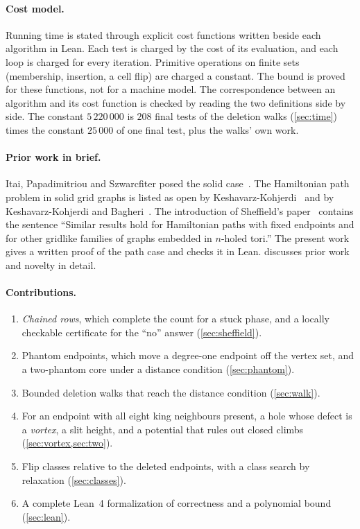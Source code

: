 \documentclass[11pt]{article}
\theoremstyle{plain}
\theoremstyle{definition}
\theoremstyle{remark}
\begin{document}
\paragraph{Cost model.}
Running time is stated through explicit cost functions written beside each algorithm in Lean.
Each test is charged by the cost of its evaluation, and each loop is charged for every iteration.
Primitive operations on finite sets (membership, insertion, a cell flip) are charged a constant.
The bound is proved for these functions, not for a machine model.
The correspondence between an algorithm and its cost function is checked by reading the two
definitions side by side.
The constant $5\,220\,000$ is $208$ final tests of the deletion walks (\cref{sec:time}) times the
constant $25\,000$ of one final test, plus the walks' own work.

\paragraph{Prior work in brief.}
Itai, Papadimitriou and Szwarcfiter posed the solid case~\cite{itai1982}.
The Hamiltonian path problem in solid grid graphs is listed as open by
Keshavarz-Kohjerdi~\cite{kk2011} and by Keshavarz-Kohjerdi and Bagheri~\cite{kkb2016c}.
The introduction of Sheffield's paper~\cite{sheffield2000} contains the sentence
``Similar results hold for Hamiltonian paths with fixed endpoints and for other gridlike families of
graphs embedded in $n$-holed tori.''
The present work gives a written proof of the path case and checks it in Lean.
 discusses prior work and novelty in detail.

\paragraph{Contributions.}
\begin{enumerate}
\item \emph{Chained rows}, which complete the count for a stuck phase, and a locally checkable
  certificate for the ``no'' answer (\cref{sec:sheffield}).
\item Phantom endpoints, which move a degree-one endpoint off the vertex set, and a two-phantom
  core under a distance condition (\cref{sec:phantom}).
\item Bounded deletion walks that reach the distance condition (\cref{sec:walk}).
\item For an endpoint with all eight king neighbours present, a hole whose defect is a
  \emph{vortex}, a slit height, and a potential that rules out closed climbs
  (\cref{sec:vortex,sec:two}).
\item Flip classes relative to the deleted endpoints, with a class search by relaxation
  (\cref{sec:classes}).
\item A complete Lean~4 formalization of correctness and a polynomial bound (\cref{sec:lean}).
\end{enumerate}
\end{document}
